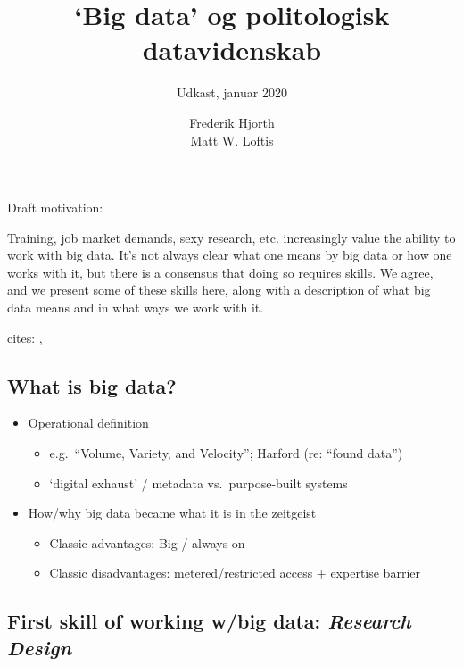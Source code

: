 \documentclass[12pt,]{article}
\title{`Big data' og politologisk datavidenskab}
\subtitle{Udkast, januar 2020}
\author{Frederik Hjorth \\ Matt W. Loftis}
\date{}
\providecommand{\tightlist}{%
  \setlength{\itemsep}{0pt}\setlength{\parskip}{0pt}}
\begin{document}
\maketitle

Draft motivation:

Training, job market demands, sexy research, etc. increasingly value the
ability to work with big data. It's not always clear what one means by
big data or how one works with it, but there is a consensus that doing
so requires skills. We agree, and we present some of these skills here,
along with a description of what big data means and in what ways we work
with it.

cites: \citet{mullainathan2017machine}, \citet{varian2014big}

\hypertarget{what-is-big-data}{%
\subsection{What is big data?}\label{what-is-big-data}}

\begin{itemize}
\tightlist
\item
  Operational definition

  \begin{itemize}
  \tightlist
  \item
    e.g.~``Volume, Variety, and Velocity''; Harford (re: ``found data'')
  \item
    `digital exhaust' / metadata vs.~purpose-built systems
  \end{itemize}
\item
  How/why big data became what it is in the zeitgeist

  \begin{itemize}
  \tightlist
  \item
    Classic advantages: Big / always on
  \item
    Classic disadvantages: metered/restricted access + expertise barrier
  \end{itemize}
\end{itemize}

\hypertarget{first-skill-of-working-wbig-data-research-design}{%
\subsection{\texorpdfstring{First skill of working w/big data:
\emph{Research
Design}}{First skill of working w/big data: Research Design}}\label{first-skill-of-working-wbig-data-research-design}}
\end{document}
